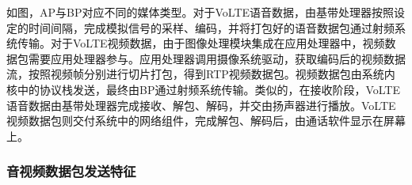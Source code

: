 
如图，AP与BP对应不同的媒体类型。对于VoLTE语音数据，由基带处理器按照设定的时间间隔，完成模拟信号的采样、编码，并将打包好的语音数据包通过射频系统传输。对于VoLTE视频数据，由于图像处理模块集成在应用处理器中，视频数据包需要应用处理器参与。应用处理器调用摄像系统驱动，获取编码后的视频数据流，按照视频帧分别进行切片打包，得到RTP视频数据包。视频数据包由系统内核中的协议栈发送，最终由BP通过射频系统传输。类似的，在接收阶段，VoLTE语音数据由基带处理器完成接收、解包、解码，并交由扬声器进行播放。VoLTE视频数据包则交付系统中的网络组件，完成解包、解码后，由通话软件显示在屏幕上。

\subsubsection{音视频数据包发送特征}
\label{chap:backinfo:volte:packets:send}

